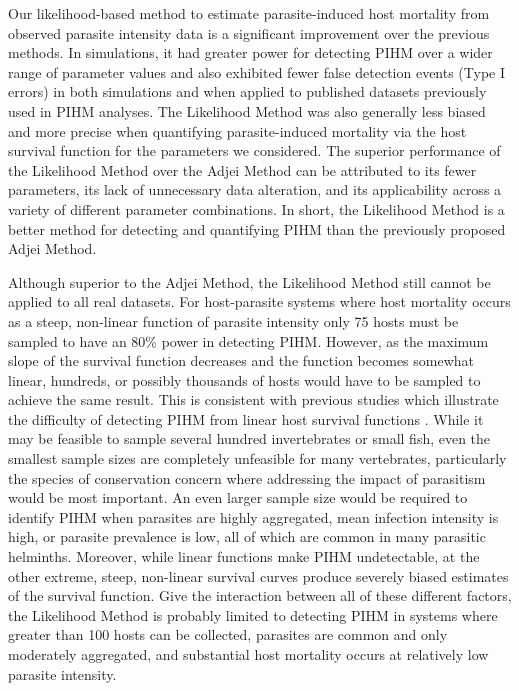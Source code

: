 \documentclass[12pt, a4paper]{article}
\begin{document}
Our likelihood-based method to estimate parasite-induced host mortality from
observed parasite intensity data is a significant improvement over the previous
methods.  In simulations, it had greater power for detecting PIHM over a wider
range of parameter values and also exhibited fewer false detection events (Type
I errors) in both simulations and when applied to published datasets previously
used in PIHM analyses. The Likelihood Method was also generally less biased and
more precise when quantifying parasite-induced mortality via the host survival
function for the parameters we considered.  The superior performance of the
Likelihood Method over the Adjei Method can be attributed to its fewer
parameters, its lack of unnecessary data alteration, and its applicability
across a variety of different parameter combinations. In short, the Likelihood
Method is a better method for detecting and quantifying PIHM than the
previously proposed Adjei Method.

Although superior to the Adjei Method, the Likelihood Method still cannot be applied to all real datasets. For host-parasite systems where host mortality occurs as a steep, non-linear function of parasite intensity only 75 hosts must be sampled to have an 80\% power in detecting PIHM. However, as the maximum slope of the survival function decreases and the function becomes somewhat linear, hundreds, or possibly thousands of hosts would have to be sampled to achieve the same result. This is consistent with previous studies which illustrate the difficulty of detecting PIHM from linear host survival functions \citep{Lanciani1989}.  While it may be feasible to sample several hundred invertebrates or small fish, even the smallest sample sizes are completely
unfeasible for many vertebrates, particularly the species of conservation
concern where addressing the impact of parasitism would be most important. An
even larger sample size would be required to identify PIHM when parasites are highly aggregated, mean infection intensity is
high, or parasite prevalence is low, all of which are
common in many parasitic helminths. Moreover, while linear functions make PIHM undetectable, at the other extreme, steep,
non-linear survival curves produce severely biased estimates of the survival
function. Give the interaction between all of these different factors, the
Likelihood Method is probably limited to detecting PIHM in systems where greater than 100 hosts can be collected, parasites are
common and only moderately aggregated, and substantial host mortality occurs at relatively low parasite intensity.
\end{document}
